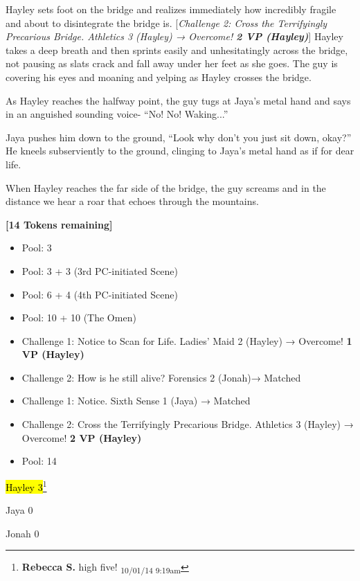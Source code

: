 Hayley sets foot on the bridge and realizes immediately how incredibly fragile and about to disintegrate the bridge is.  {[}\textit{Challenge 2: Cross the Terrifyingly Precarious Bridge.  Athletics 3 (Hayley) → Overcome! }\textit{\textbf{2 VP (Hayley)}}{]}  Hayley takes a deep breath and then sprints easily and unhesitatingly across the bridge, not pausing as slats crack and fall away under her feet as she goes.  The guy is covering his eyes and moaning and yelping as Hayley crosses the bridge.

As Hayley reaches the halfway point, the guy tugs at Jaya's metal hand and says in an anguished sounding voice- ``No!  No!  Waking...''

Jaya pushes him down to the ground, ``Look why don't you just sit down, okay?''  He kneels subserviently to the ground, clinging to Jaya's metal hand as if for dear life.

When Hayley reaches the far side of the bridge, the guy screams and in the distance we hear a roar that echoes through the mountains.



\textbf{{[}14 Tokens remaining{]}}





\begin{itemize}
\item Pool: 3
\item Pool: 3 + 3 (3rd PC-initiated Scene)
\item Pool: 6 + 4 (4th PC-initiated Scene)
\item Pool: 10 + 10 (The Omen)
\item Challenge 1: Notice to Scan for Life.  Ladies' Maid 2 (Hayley) → Overcome! \textbf{1 VP (Hayley)}
\item Challenge 2:  How is he still alive?  Forensics 2 (Jonah)→ Matched
\item Challenge 1: Notice.  Sixth Sense 1 (Jaya) → Matched 
\item Challenge 2: Cross the Terrifyingly Precarious Bridge.  Athletics 3 (Hayley) → Overcome! \textbf{2 VP (Hayley)}
\item Pool: 14
\end{itemize}





{\parskip=0pt
\hl{Hayley 3}\footnote{\textbf{Rebecca S. }high five! \textsubscript{10/01/14 9:19am}}

Jaya 0

Jonah 0
}



